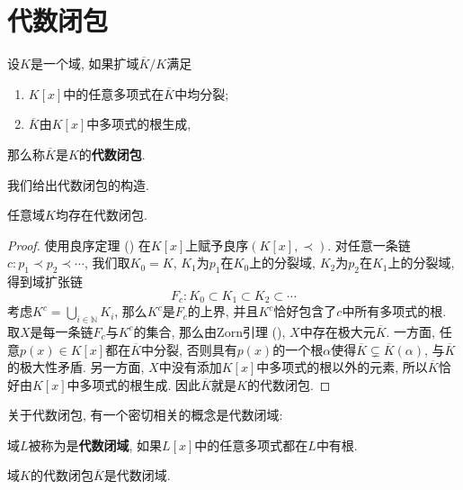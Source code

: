 \section{代数闭包}
\begin{defn}
    设$K$是一个域, 如果扩域$\overline{K}/K$满足
    \begin{enumerate}[(1)]
        \item $K[x]$中的任意多项式在$\overline{K}$中均分裂;
        \item $\overline{K}$由$K[x]$中多项式的根生成,
    \end{enumerate}
    那么称$\overline{K}$是$K$的\textbf{代数闭包}.
\end{defn}

我们给出代数闭包的构造.
\begin{thm}
    任意域$K$均存在代数闭包.
\end{thm}
\begin{proof}
    使用良序定理 (\parencite[附录2, 定理4.1]{Lang}) 在$K[x]$上赋予良序$(K[x],\prec)$.
    对任意一条链$c:p_1\prec p_2\prec\cdots$, 我们取$K_0=K$, $K_1$为$p_1$在$K_0$上的分裂域, $K_2$为$p_2$在$K_1$上的分裂域, 得到域扩张链
    \[F_c:K_0\subset K_1\subset K_2\subset\cdots\]
    考虑$K^c=\bigcup_{i\in\mathbb{N}}K_i$, 那么$K^c$是$F_c$的上界, 并且$K^c$恰好包含了$c$中所有多项式的根.
    取$X$是每一条链$F_c$与$K^c$的集合, 那么由Zorn引理 (\parencite[附录2第2节]{Lang}), $X$中存在极大元$\overline{K}$.
    一方面, 任意$p(x)\in K[x]$都在$\overline{K}$中分裂, 否则具有$p(x)$的一个根$\alpha$使得$\overline{K}\subsetneq\overline{K}(\alpha)$, 与$\overline{K}$的极大性矛盾.
    另一方面, $X$中没有添加$K[x]$中多项式的根以外的元素, 所以$\overline{K}$恰好由$K[x]$中多项式的根生成.
    因此$\overline{K}$就是$K$的代数闭包.
\end{proof}

关于代数闭包, 有一个密切相关的概念是代数闭域:
\begin{defn}
    域$L$被称为是\textbf{代数闭域}, 如果$L[x]$中的任意多项式都在$L$中有根.
\end{defn}
\begin{prop}
    域$K$的代数闭包$\overline{K}$是代数闭域.
\end{prop}